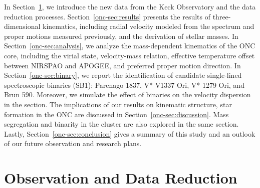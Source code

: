 \documentclass[12pt]{ucsddissertation}
\begin{document}
\begin{CJK*}{UTF8}{gbsn}
In Section~\ref{onc-sec:observation}, we introduce the new data from the Keck Observatory and the data reduction processes. Section~\ref{onc-sec:results} presents the results of three-dimensional kinematics, including radial velocity modeled from the spectrum and proper motions measured previously, and the derivation of stellar masses. In Section~\ref{onc-sec:analysis}, we analyze the mass-dependent kinematics of the ONC core, including the virial state, velocity-mass relation, effective temperature offset between NIRSPAO and APOGEE, and preferred proper motion direction. In Section~\ref{onc-sec:binary}, we report the identification of candidate single-lined spectroscopic binaries (SB1): Parenago 1837, V* V1337 Ori, V* 1279 Ori, and Brun 590. Moreover, we simulate the effect of binaries on the velocity dispersion in the section. The implications of our results on kinematic structure, star formation in the ONC are discussed in Section~\ref{onc-sec:discussion}. Mass segregation and binarity in the cluster are also explored in the same section. Lastly, Section~\ref{onc-sec:conclusion} gives a summary of this study and an outlook of our future observation and research plans.

\section{Observation and Data Reduction}
\label{onc-sec:observation}


\end{CJK*}
\end{document}
